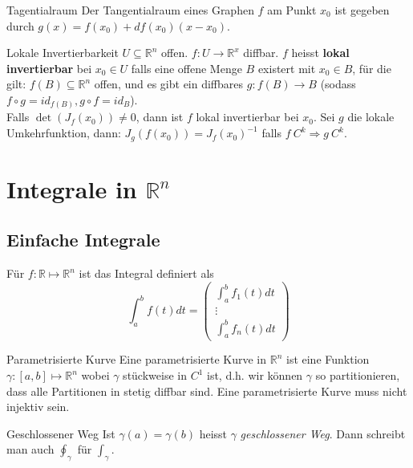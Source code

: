\documentclass[a4paper,10pt]{article}
\def\R{\mathbb{R}}
\begin{document}
\begin{subbox}{Tagentialraum}
    Der Tangentialraum eines Graphen $f$ am Punkt $x_0$ ist gegeben durch $g(x) = f(x_0) + df(x_0)(x-x_0)$. 
\end{subbox}
\begin{mainbox}{Lokale Invertierbarkeit}
$U \subseteq \mathbb{R}^n$ offen. $f: U \rightarrow \mathbb{R}^x$ diffbar. $f$ heisst \textbf{lokal invertierbar} bei $x_0 \in U$ falls eine offene Menge $B$ existert mit $x_0 \in B$, für die gilt: $f(B) \subseteq \mathbb{R}^n$ offen, und es gibt ein diffbares $g: f(B) \rightarrow B$  
(sodass $f \circ g=i d_{f(B)}, g \circ f=i d_B$).\\
Falls $\operatorname{det}\left(J_f\left(x_0\right)\right) \neq 0$, dann ist $f$ lokal invertierbar bei $x_0$. Sei $g$ die lokale Umkehrfunktion, dann: $J_g\left(f\left(x_0\right)\right)=J_f\left(x_0\right)^{-1}$ falls $f\ C^k \Rightarrow g\ C^k$.
\end{mainbox}




\section{Integrale in \texorpdfstring{$\R^n$}{Rⁿ}}
\subsection{Einfache Integrale}
Für $f: \R \mapsto \R^n$ ist das Integral definiert als
$$\int_a^b f(t)dt = 
\begin{pmatrix*}
    \int_a^b f_1(t) dt \\
    \vdots\\
    \int_a^b f_n(t) dt
\end{pmatrix*}
$$

\begin{mainbox}{Parametrisierte Kurve}
    Eine parametrisierte Kurve in $\R^n$ ist eine Funktion $\gamma: \left[a,b\right] \mapsto \R^n$ wobei $\gamma$ stückweise in $C^1$ ist, d.h. wir können $\gamma$ so partitionieren, dass alle Partitionen in stetig diffbar sind. Eine parametrisierte Kurve muss nicht injektiv sein.
\end{mainbox}

\begin{mainbox}{Geschlossener Weg}
    Ist $\gamma (a)=\gamma(b)$ heisst $\gamma$ \textit{geschlossener Weg}. Dann schreibt man auch $\oint_{\gamma}$ für $\int_{\gamma}$.
\end{mainbox}
\end{document}
